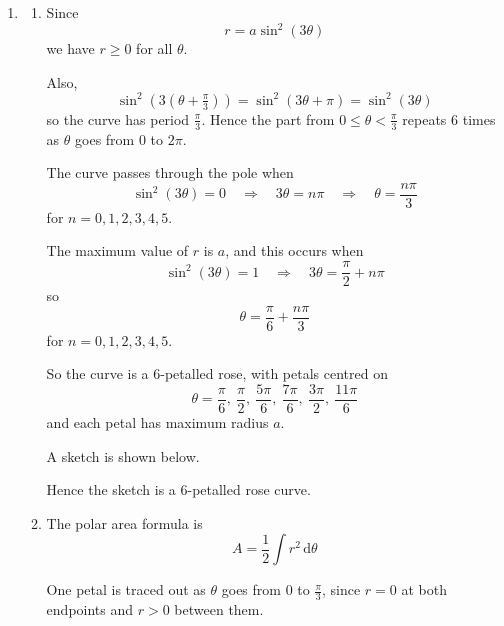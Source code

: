 \documentclass[leqno]{article}
\begin{document}
\begin{enumerate}[
	  label=\textbf{\arabic*.},
	  leftmargin=*,
	  topsep=0pt,
	  partopsep=0pt,
	  parsep=0pt
	]
	\vspace*{30pt}
	
	\begin{tcolorbox}[colback=white, colframe=scarlet, title={\textbf{Solution}}, breakable, grow to left by=6mm, grow to right by=10mm]
	\begin{enumerate}[label=\textbf{(\alph*)}]
	  \item
	  \begin{enumerate}[label=(\roman*)]
		\item Since
		\[
		r=a\sin^2(3\theta)
		\]
		we have $r\geq 0$ for all $\theta$.
	
		Also,
		\[
		\sin^2(3(\theta+\tfrac{\pi}{3}))=\sin^2(3\theta+\pi)=\sin^2(3\theta)
		\]
		so the curve has period $\tfrac{\pi}{3}$. Hence the part from $0\leq \theta<\tfrac{\pi}{3}$ repeats 6 times as $\theta$ goes from $0$ to $2\pi$.
	
		The curve passes through the pole when
		\[
		\sin^2(3\theta)=0 \quad \Rightarrow \quad 3\theta=n\pi \quad \Rightarrow \quad \theta=\frac{n\pi}{3}
		\]
		for $n=0,1,2,3,4,5$.
	
		The maximum value of $r$ is $a$, and this occurs when
		\[
		\sin^2(3\theta)=1 \quad \Rightarrow \quad 3\theta=\frac{\pi}{2}+n\pi
		\]
		so
		\[
		\theta=\frac{\pi}{6}+\frac{n\pi}{3}
		\]
		for $n=0,1,2,3,4,5$.
	
		So the curve is a 6-petalled rose, with petals centred on
		\[
		\theta=\frac{\pi}{6},\ \frac{\pi}{2},\ \frac{5\pi}{6},\ \frac{7\pi}{6},\ \frac{3\pi}{2},\ \frac{11\pi}{6}
		\]
		and each petal has maximum radius $a$.
	
		A sketch is shown below.
	
	
		Hence the sketch is a 6-petalled rose curve.
	
		\item The polar area formula is
		\[
		A=\frac{1}{2}\int r^2\,\mathrm{d}\theta
		\]
	
		One petal is traced out as $\theta$ goes from $0$ to $\tfrac{\pi}{3}$, since $r=0$ at both endpoints and $r>0$ between them.
	

\end{enumerate}
\end{enumerate}
\end{tcolorbox}
\end{enumerate}
\end{document}

